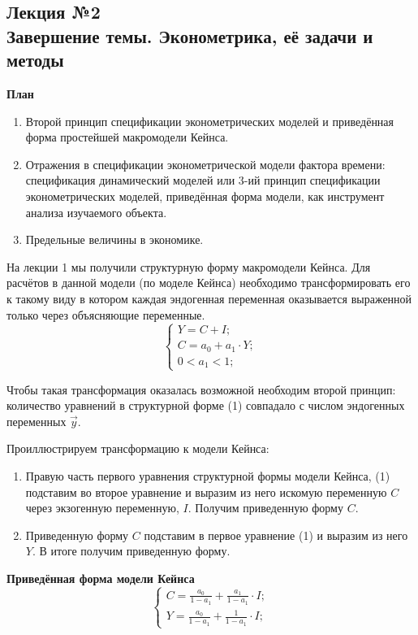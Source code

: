\documentclass[12pt,a4paper]{article}
\author{Аверьянов Тимофей, Корякин Алексей}
\begin{document}
\begin{center}
\section*{Лекция №2 \\
Завершение темы. Эконометрика, её задачи и методы}
\end{center}
\begin{center}
\textbf{План}
\end{center}
\begin{enumerate}
\item Второй принцип спецификации эконометрических моделей и приведённая форма простейшей макромодели Кейнса.
\item Отражения в спецификации эконометрической модели фактора времени: спецификация динамический моделей или 3-ий принцип спецификации эконометрических моделей, приведённая форма модели, как инструмент анализа изучаемого объекта.
\item Предельные величины в экономике.
\end{enumerate}
На лекции 1 мы получили структурную форму макромодели Кейнса. Для расчётов в данной модели (по моделе Кейнса) необходимо трансформировать его к такому виду в котором каждая эндогенная переменная оказывается выраженной только через объясняющие переменные.
\begin{equation}
\begin{cases}
Y = C + I; \\
C = a_0 + a_1 \cdot Y; \\
0 < a_1 < 1;
\end{cases}
\end{equation}

Чтобы такая трансформация оказалась возможной необходим второй принцип: количество уравнений в структурной форме (1) совпадало с числом эндогенных переменных $\vec{y}$.

Проиллюстрируем трансформацию к модели Кейнса:
\begin{enumerate}
\item Правую часть первого уравнения структурной формы модели Кейнса, (1) подставим во второе уравнение и выразим из него искомую переменную $C$ через экзогенную переменную, $I$. Получим приведенную форму $C$.
\item Приведенную форму $C$ подставим в первое уравнение (1) и выразим из него $Y$. В итоге получим приведенную форму.
\end{enumerate}
\textbf{Приведённая форма модели Кейнса}
\begin{equation}
\begin{cases}
C = \displaystyle{\frac{a_0}{1-a_1} + \frac{a_1}{1-a_1}} \cdot I; \\
Y = \displaystyle{\frac{a_0}{1-a_1} + \frac{1}{1-a_1}} \cdot I;
\end{cases}
\end{equation}
\end{document}
